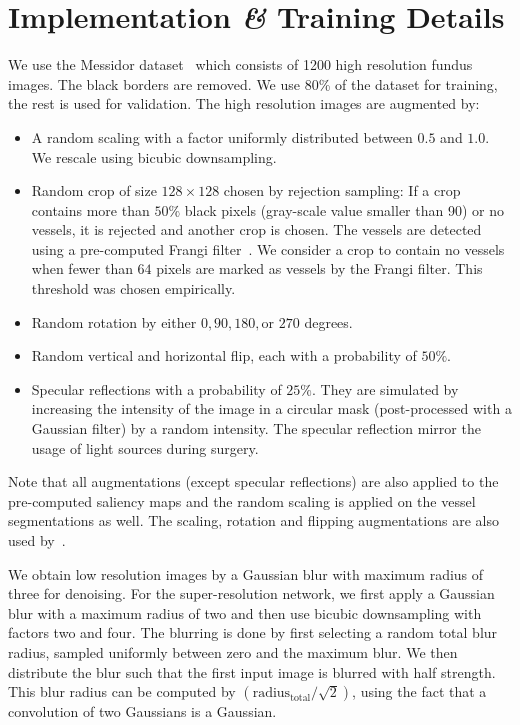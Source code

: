 \documentclass{scrartcl}
\begin{document}
\section{Implementation \textit{\&} Training Details}
We use the Messidor dataset~\cite{Messidor} which consists of 1200 high resolution fundus images.
The black borders are removed.
We use 80\% of the dataset for training, the rest is used for validation.
The high resolution images are augmented by:
\begin{itemize}
\item A random scaling with a factor uniformly distributed between $0.5$ and $1.0$.
  We rescale using bicubic downsampling.
\item Random crop of size $128 \times 128$ chosen by rejection sampling:
If a crop contains more than $50\%$ black pixels (gray-scale value smaller than 90) or no vessels, it is rejected and another crop is chosen.
The vessels are detected using a pre-computed Frangi filter~\cite{Frangi}.
We consider a crop to contain no vessels when fewer than $64$ pixels are marked as vessels by the Frangi filter.
This threshold was chosen empirically.
\item Random rotation by either $0, 90, 180, \text{or } 270$ degrees.
\item Random vertical and horizontal flip, each with a probability of $50\%$.
\item Specular reflections with a probability of $25\%$.
They are simulated by increasing the intensity of the image in a circular mask (post-processed with a Gaussian filter) by a random intensity.
The specular reflection mirror the usage of light sources during surgery.
\end{itemize}
Note that all augmentations (except specular reflections) are also applied to the pre-computed saliency maps and the random scaling is applied on the vessel segmentations as well.
The scaling, rotation and flipping augmentations are also used by~\cite{LapSRN}.

We obtain low resolution images by a Gaussian blur with maximum radius of three for denoising.
For the super-resolution network, we first apply a Gaussian blur with a maximum radius of two and then use bicubic downsampling with factors two and four.
The blurring is done by first selecting a random total blur radius, sampled uniformly between zero and the maximum blur.
We then distribute the blur such that the first input image is blurred with half strength.
This blur radius can be computed by \( \left( \text{radius}_{\text{total}} / \sqrt{2} \right)\), using the fact that a convolution of two Gaussians is a Gaussian.
\end{document}
